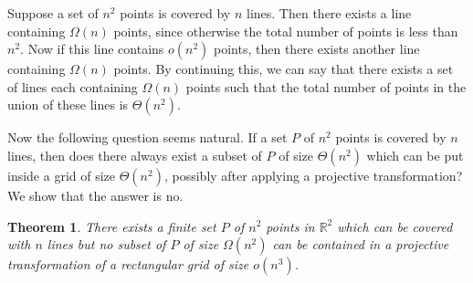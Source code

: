 \documentclass[
final
]{dmtcs-episciences}
\numberwithin{equation}{subsection}
\newtheorem{thm}[defn]{Theorem}%
\begin{document}
\medskip	

Suppose a set of $n^2$ points is covered by $n$ lines. Then there exists a line containing $\Omega (n)$ points, since otherwise the total number of points is less than $n^2$. Now if this line contains $o(n^2)$ points, then there exists another line containing $\Omega (n)$ points. By continuing this, we can say that there exists a set of lines each containing $\Omega (n)$ points such that the total number of points in the union of these lines is $\Theta (n^2)$.

\medskip	

Now the following question seems natural. If a set $P$ of $n^2$ points is covered by $n$ lines, then does there always exist a subset of $P$ of size $\Theta (n^2)$  which can be put inside a grid of size $\Theta (n^2)$, possibly after applying a projective transformation? We show that the answer is no.

\medskip	

\begin{thm}
	\label{thm:line-converse}
	There exists a finite set $P$ of $n^2$ points in $\mathbb{R}^2$ which can be covered with $n$ lines but no subset of $P$ of size $\Omega (n^2)$ can be contained in a projective transformation of a rectangular grid of size $o(n^3)$.
\end{thm}
\end{document}

